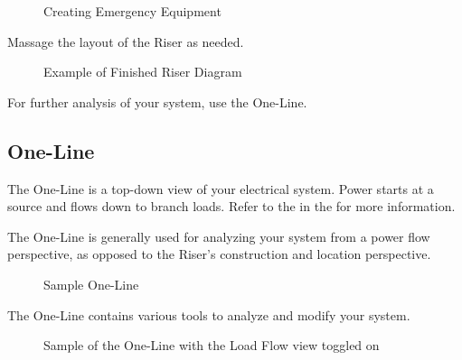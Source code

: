 \documentclass[letterpaper,10pt,english]{sphinxmanual}
\begin{document}
\begin{figure}[H]
\centering
\capstart

\noindent{}
\caption{Creating Emergency Equipment}\label{\detokenize{docs/tutorial/index-tutorial:id19}}\end{figure}

Massage the layout of the Riser as needed.

\begin{figure}[H]
\centering
\capstart

\noindent{}
\caption{Example of Finished Riser Diagram}\label{\detokenize{docs/tutorial/index-tutorial:id20}}\end{figure}

For further analysis of your system, use the One-Line.


\subsection{One-Line}
\label{\detokenize{docs/tutorial/index-tutorial:one-line}}
The One-Line is a top-down view of your electrical system.  Power starts at a source and flows down to branch loads.  Refer to the {\hyperref[\detokenize{docs/userguide/buildingelectricalmodel/one-line/index-one-line:one-line}]{}} in the {\hyperref[\detokenize{docs/userguide/index-user_guide:user-guide}]{}} for more information.

The One-Line is generally used for analyzing your system from a power flow perspective, as opposed to the Riser’s construction and location perspective.

\begin{figure}[H]
\centering
\capstart

\noindent{}
\caption{Sample One-Line}\label{\detokenize{docs/tutorial/index-tutorial:id21}}\end{figure}

The One-Line contains various tools to analyze and modify your system.

\begin{figure}[H]
\centering
\capstart

\noindent{}
\caption{Sample of the One-Line with the Load Flow view toggled on}\label{\detokenize{docs/tutorial/index-tutorial:id22}}\end{figure}
\end{document}
